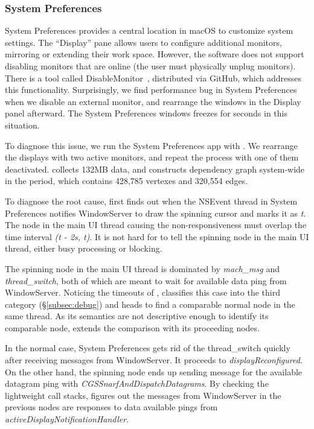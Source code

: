 \subsubsection{System Preferences}

System Preferences provides a central location in macOS to customize system
settings. The ``Display'' pane allows users to configure additional monitors,
mirroring or extending their work space. However, the software does not support
disabling monitors that are online (the user must physically unplug monitors).
There is a tool called DisableMonitor~\cite{disablemonitor}, distributed via
GitHub, which addresses this functionality. Surprisingly, we find performance
bug in System Preferences when we disable an external monitor, and rearrange
the windows in the Display panel afterward. The System Preferences windows
freezes for seconds in this situation.

To diagnose this issue, we run the System Preferences app with \xxx. We
rearrange the displays with two active monitors, and repeat the process with
one of them deactivated. \xxx collects 132MB data, and constructs dependency
graph system-wide in the period, which contains 428,785 vertexes and 320,554
edges.

To diagnose the root cause, \xxx first finds out when the NSEvent thread in
System Preferences notifies WindowServer to draw the spinning cursor and marks
it as \textit{t}. The node in the main UI thread causing the non-responsiveness
must overlap the time interval \textit{(t - 2s, t)}. It is not hard for
\xxx to tell the spinning node in the main UI thread, either busy processing or
blocking.

The spinning node in the main UI thread is dominated by \textit{mach\_msg} and
\textit{thread\_switch}, both of which are meant to wait for available data
ping from WindowServer. Noticing the timeouts of , \xxx
classifies this case into the third category (\S\ref{subsec:debug}) and heads
to find a comparable normal node in the same thread. As its semantics are not
descriptive enough to identify its comparable node, \xxx extends the comparison
with its proceeding nodes.

In the normal case, System Preferences gets rid of the thread\_switch
quickly after receiving messages from WindowServer. It proceeds
to \textit{displayReconfigured}. On the other hand, the spinning
node ends up sending message for the available datagram ping with
\textit{CGSSnarfAndDispatchDatagrams}. By checking the lightweight call stacks,
\xxx figures out the messages from WindowServer in the previous nodes are
responses to data available pings from \textit{activeDisplayNotificationHandler}.

